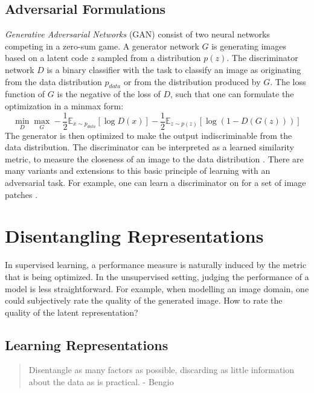 	\subsection{Adversarial Formulations}\label{sec:adversarial}
		\textit{Generative Adversarial Networks} (GAN) \cite{goodfellow14gan} consist of two neural networks competing in a zero-sum game. A generator network $G$ is generating images based on a latent code $z$ sampled from a distribution $p(z)$. The discriminator network $D$ is a binary classifier with the task to classify an image as originating from the data distribution $p_{data}$ or from the distribution produced by $G$. The loss function of $G$ is the negative of the loss of $D$, such that one can formulate the optimization in a minmax form:
		\begin{equation}
				\min_D \max_G - \frac{1}{2} \mathds{E}_{x\sim p_{data}}[\log D(x)] - \frac{1}{2}\mathds{E}_{z\sim p(z)}[\log (1-D(G(z)))]
		\end{equation}
		The generator is then optimized to make the output indiscriminable from the data distribution.
		The discriminator can be interpreted as a learned similarity metric, to measure the closeness of an image to the data distribution \cite{larsen15vaegan}.
		There are many variants and extensions to this basic principle of learning with an adversarial task. For example, one can learn a discriminator on for a set of image patches \cite{isola17image2image}. 

\section{Disentangling Representations}\label{sec:disentangled}
	In supervised learning, a performance measure is naturally induced by the metric that is being optimized. In the unsupervised setting, judging the performance of a model is less straightforward. For example, when modelling an image domain, one could subjectively rate the quality of the generated image.  How to rate the quality of the latent representation?

	\subsection{Learning Representations}

	\begin{quote}
		{Disentangle as many factors as possible, discarding as little information about the data as is practical.} - Bengio \etal \cite{bengio13rep} %
	\end{quote}

